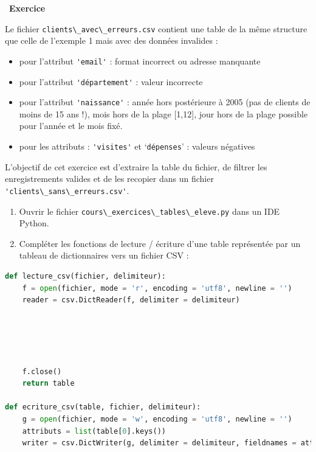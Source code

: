 \documentclass[
  11pt,
]{article}
\newcommand{\passthrough}[1]{#1}
\providecommand{\tightlist}{%
  \setlength{\itemsep}{0pt}\setlength{\parskip}{0pt}}
\newcounter{exo}
\newenvironment{exercice}[1]
{\par \medskip   \addtocounter{exo}{1} \noindent  
\begin{bclogo}[arrondi =0.1,   noborder = true, logo=\bccrayon, marge=4]{~\textbf{Exercice} \textbf{\theexo} {\itshape #1} }  \par}
{
\end{bclogo}
 \par \bigskip }
\newcounter{def}
\newcounter{cours}
\begin{document}
\begin{exercice}{}

Le fichier \passthrough{\lstinline!clients\_avec\_erreurs.csv!} contient
une table de la même structure que celle de l'exemple 1 mais avec des
données invalides :

\begin{itemize}
\tightlist
\item
  pour l'attribut \passthrough{\lstinline!'email'!} : format incorrect
  ou adresse manquante
\item
  pour l'attribut \passthrough{\lstinline!'département'!} : valeur
  incorrecte
\item
  pour l'attribut \passthrough{\lstinline!'naissance'!} : année hors
  postérieure à 2005 (pas de clients de moins de 15 ans !), mois hors de
  la plage {[}1,12{]}, jour hors de la plage possible pour l'année et le
  mois fixé.
\item
  pour les attributs : \passthrough{\lstinline!'visites'!} et
  `\passthrough{\lstinline!dépenses!}' : valeurs négatives
\end{itemize}

L'objectif de cet exercice est d'extraire la table du fichier, de
filtrer les enregistrements valides et de les recopier dans un fichier
\passthrough{\lstinline!'clients\_sans\_erreurs.csv'!}.

\begin{enumerate}
\def\labelenumi{\arabic{enumi}.}
\tightlist
\item
  Ouvrir le fichier
  \passthrough{\lstinline!cours\_exercices\_tables\_eleve.py!} dans un
  IDE Python.
\item
  Compléter les fonctions de lecture / écriture d'une table représentée
  par un tableau de dictionnaires vers un fichier CSV :
\end{enumerate}

\begin{lstlisting}[language=Python]
def lecture_csv(fichier, delimiteur):   
    f = open(fichier, mode = 'r', encoding = 'utf8', newline = '')
    reader = csv.DictReader(f, delimiter = delimiteur)  
    




    f.close()
    return table

def ecriture_csv(table, fichier, delimiteur):
    g = open(fichier, mode = 'w', encoding = 'utf8', newline = '')
    attributs = list(table[0].keys())
    writer = csv.DictWriter(g, delimiter = delimiteur, fieldnames = attributs) 






\end{lstlisting}
\end{exercice}
\end{document}
